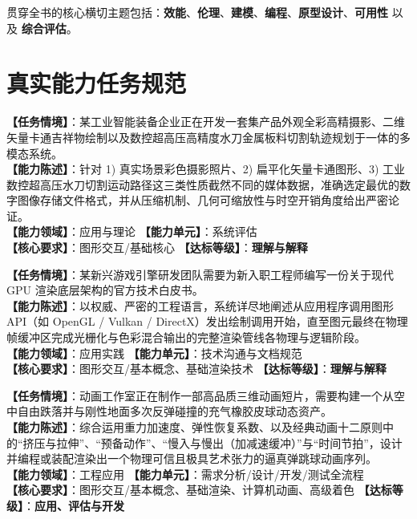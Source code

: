 贯穿全书的核心横切主题包括：\textbf{效能}、\textbf{伦理}、\textbf{建模}、\textbf{编程}、\textbf{原型设计}、\textbf{可用性} 以及 \textbf{综合评估}。

\section{真实能力任务规范}

\begin{taskbox}[任务 1：多场景数字图像格式甄别与工程选型]
\textbf{【任务情境】}：某工业智能装备企业正在开发一套集产品外观全彩高精摄影、二维矢量卡通吉祥物绘制以及数控超高压高精度水刀金属板料切割轨迹规划于一体的多模态系统。\\
\textbf{【能力陈述】}：针对 1) 真实场景彩色摄影照片、2) 扁平化矢量卡通图形、3) 工业数控超高压水刀切割运动路径这三类性质截然不同的媒体数据，准确选定最优的数字图像存储文件格式，并从压缩机制、几何可缩放性与时空开销角度给出严密论证。\\
\textbf{【能力领域】}：应用与理论 \quad \textbf{【能力单元】}：系统评估\\
\textbf{【核心要求】}：图形交互/基础核心 \quad \textbf{【达标等级】}：\textbf{理解与解释}
\end{taskbox}

\begin{taskbox}[任务 2：现代图形渲染管线技术白皮书撰写]
\textbf{【任务情境】}：某新兴游戏引擎研发团队需要为新入职工程师编写一份关于现代 GPU 渲染底层架构的官方技术白皮书。\\
\textbf{【能力陈述】}：以权威、严密的工程语言，系统详尽地阐述从应用程序调用图形 API（如 OpenGL / Vulkan / DirectX）发出绘制调用开始，直至图元最终在物理帧缓冲区完成光栅化与色彩混合输出的完整渲染管线各物理与逻辑阶段。\\
\textbf{【能力领域】}：应用实践 \quad \textbf{【能力单元】}：技术沟通与文档规范\\
\textbf{【核心要求】}：图形交互/基本概念、基础渲染技术 \quad \textbf{【达标等级】}：\textbf{理解与解释}
\end{taskbox}

\begin{taskbox}[任务 3：遵循物理与艺术法则的真实弹跳球动画制作]
\textbf{【任务情境】}：动画工作室正在制作一部高品质三维动画短片，需要构建一个从空中自由跌落并与刚性地面多次反弹碰撞的充气橡胶皮球动态资产。\\
\textbf{【能力陈述】}：综合运用重力加速度、弹性恢复系数、以及经典动画十二原则中的“挤压与拉伸”、“预备动作”、“慢入与慢出（加减速缓冲）”与“时间节拍”，设计并编程或装配渲染出一个物理可信且极具艺术张力的逼真弹跳球动画序列。\\
\textbf{【能力领域】}：工程应用 \quad \textbf{【能力单元】}：需求分析/设计/开发/测试全流程\\
\textbf{【核心要求】}：图形交互/基本概念、基础渲染、计算机动画、高级着色 \quad \textbf{【达标等级】}：\textbf{应用、评估与开发}
\end{taskbox}

